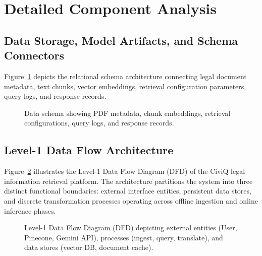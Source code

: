 \documentclass[12pt,a4paper]{report}
\begin{document}
\section{Detailed Component Analysis}

\subsection{Data Storage, Model Artifacts, and Schema Connectors}
Figure~\ref{fig:db_schema} depicts the relational schema architecture connecting legal document metadata, text chunks, vector embeddings, retrieval configuration parameters, query logs, and response records.

\begin{figure}[H]
    \centering
    \caption{Data schema showing PDF metadata, chunk embeddings, retrieval configurations, query logs, and response records.}
    \label{fig:db_schema}
\end{figure}

\subsection{Level-1 Data Flow Architecture}
Figure~\ref{fig:data_flow_diagram} illustrates the Level-1 Data Flow Diagram (DFD) of the CiviQ legal information retrieval platform. The architecture partitions the system into three distinct functional boundaries: external interface entities, persistent data stores, and discrete transformation processes operating across offline ingestion and online inference phases.

\begin{figure}[H]
    \centering
    \caption{Level-1 Data Flow Diagram (DFD) depicting external entities (User, Pinecone, Gemini API), processes (ingest, query, translate), and data stores (vector DB, document cache).}
    \label{fig:data_flow_diagram}
\end{figure}
\end{document}
